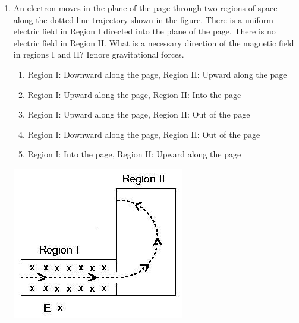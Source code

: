 \documentclass[12pt, a4paper]{article}
\begin{document}
\begin{CJK*}{UTF8}{gbsn}
\begin{enumerate}[itemsep=1.0em, topsep=0.6em]
\item \label{prob:8}
\noindent\begin{minipage}[t]{0.55\linewidth}
\vspace{0pt}
An electron moves in the plane of the page through two regions of space along the dotted-line trajectory shown in the figure. There is a uniform electric field in Region I directed into the plane of the page. There is no electric field in Region II. What is a necessary direction of the magnetic field in regions I and II? Ignore gravitational forces.
\begin{enumerate}[label=(\Alph*)]
    \item Region I: Downward along the page, Region II: Upward along the page
    \item Region I: Upward along the page, Region II: Into the page
    \item Region I: Upward along the page, Region II: Out of the page
    \item Region I: Downward along the page, Region II: Out of the page
    \item Region I: Into the page, Region II: Upward along the page
\end{enumerate}
\end{minipage}%
\hfill
\begin{minipage}[t]{0.4\linewidth}
\vspace{0pt}
\centering
\includegraphics[width=\linewidth]{Problem_08_Figure.png}
\end{minipage}


\end{enumerate}
\end{CJK*}
\end{document}
